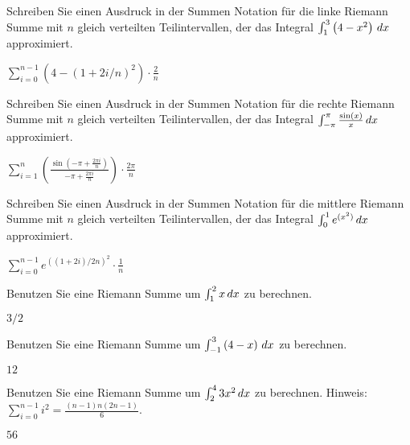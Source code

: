 \begin{exercises}
\begin{exercise}
Schreiben Sie einen Ausdruck in der Summen Notation für die linke Riemann Summe mit $n$ gleich verteilten Teilintervallen, der das Integral $\int_1^3 \left(4-x^2\right) \, d x$ approximiert.
\begin{answer}
$\sum_{i=0}^{n-1} \left( 4 - (1+2i/n)^2\right)\cdot \frac{2}{n}$
\end{answer}
\end{exercise}

\begin{exercise}
Schreiben Sie einen Ausdruck in der Summen Notation für die rechte Riemann Summe mit $n$ gleich verteilten Teilintervallen, der das Integral $\int_{-\pi}^\pi
\frac{\sin(x)}{x} \, d x$ approximiert.
\begin{answer}
$\sum_{i=1}^{n} \left(\frac{\sin\left(-\pi + \frac{2\pi i}{n}\right)}{-\pi + \frac{2\pi i}{n}}\right)\cdot \frac{2\pi}{n}$
\end{answer}
\end{exercise}

\begin{exercise}
Schreiben Sie einen Ausdruck in der Summen Notation für die mittlere Riemann Summe mit $n$ gleich verteilten Teilintervallen, der das Integral $\int_{0}^1 e^{(x^2)} \, d x$ approximiert.
\begin{answer}
$\sum_{i=0}^{n-1} e^{((1+2i)/2n)^2} \cdot \frac{1}{n}$
\end{answer}
\end{exercise}

\begin{exercise} 
Benutzen Sie eine Riemann Summe um  $\int_1^2 x \, d x$ zu berechnen.
\begin{answer}
$3/2$
\end{answer}
\end{exercise}

\begin{exercise}
Benutzen Sie eine Riemann Summe um $\int_{-1}^3 \left(4-x\right) \, d x$ zu berechnen.
\begin{answer}
$12$
\end{answer}
\end{exercise}


\begin{exercise}
Benutzen Sie eine Riemann Summe um $\int_{2}^4 3x^2 \, d x$ zu berechnen. Hinweis:
$\sum_{i=0}^{n-1} i^2 = \frac{(n-1)n(2n-1)}{6}$.
\begin{answer}
$56$
\end{answer}
\end{exercise}



\end{exercises}

